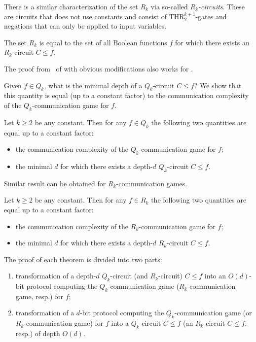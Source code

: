 \documentclass{toc}
\def\THR{\mathrm{THR}}
\begin{document}
There is a similar characterization of the set $R_k$ via so-called \emph{$R_k$-circuits}. These are circuits that does not use constants and consist of $\THR^{k + 1}_2$-gates and negations that can only be applied to input variables.
\begin{proposition}
\label{R_k_char}
The set $R_k$ is equal to the set of all Boolean functions $f$ for which there exists an $R_k$-circuit $C \le f$.
\end{proposition}
The proof from~\cite{Cohen2013} of  with obvious modifications also works for .

Given $f\in Q_k$, what is the minimal depth of a $Q_k$-circuit $C\le f$? We show that this quantity is equal (up to a constant factor) to the communication complexity of the $Q_k$-communication game for $f$.

\begin{theorem}
\label{Q_k_main}
Let $k \ge 2$ be any constant. Then for any $f\in Q_k$ the following two quantities are equal up to a constant factor:
\begin{itemize}
\item the communication complexity of the $Q_k$-communication game for $f$;
\item the minimal $d$ for which there exists a
%
depth-$d$   %
$Q_k$-circuit $C \le f$.
\end{itemize}
\end{theorem}

 Similar result can be obtained for $R_k$-communication games.

\begin{theorem}
\label{R_k_main}
Let $k \ge 2$ be any constant. Then for any $f\in R_k$ the following two quantities are equal up to a constant factor:
\begin{itemize}
\item the communication complexity of the $R_k$-communication game for $f$;
\item the minimal $d$ for which there exists a
%
depth-$d$   %
$R_k$-circuit $C \le f$.
\end{itemize}
\end{theorem}

%
The proof of each theorem is divided into two parts: %
\begin{enumerate}[label=(\alph*)]
\item  transformation of a depth-$d$ $Q_k$-circuit 
%
(and $R_k$-circuit)  %
$C \le f$ into an $O(d)$-bit protocol computing the $Q_k$-communication 
%
game ($R_k$-communication game, resp.) for $f$;  %
\item  transformation of a $d$-bit protocol computing the
$Q_k$-communication game (or $R_k$-communication game)
for $f$ into %
a $Q_k$-circuit $C\le f$
(an $R_k$-circuit $C\le f$, resp.) %
of depth $O(d)$.  %
\end{enumerate}
\end{document}
